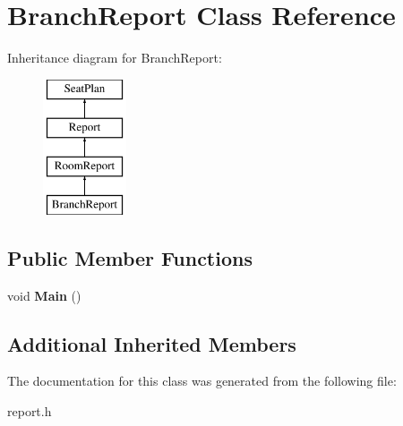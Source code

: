 \hypertarget{classBranchReport}{\section{Branch\-Report Class Reference}
\label{classBranchReport}
}
Inheritance diagram for Branch\-Report\-:\begin{figure}[H]
\begin{center}
\leavevmode
\includegraphics[height=4.000000cm]{classBranchReport}
\end{center}
\end{figure}
\subsection*{Public Member Functions}
\begin{DoxyCompactItemize}
\item 
\hypertarget{classBranchReport_acafa37b5ff6b8886333cc5ab8bb53fad}{void {\bfseries Main} ()}\label{classBranchReport_acafa37b5ff6b8886333cc5ab8bb53fad}

\end{DoxyCompactItemize}
\subsection*{Additional Inherited Members}


The documentation for this class was generated from the following file\-:\begin{DoxyCompactItemize}
\item 
report.\-h\end{DoxyCompactItemize}
